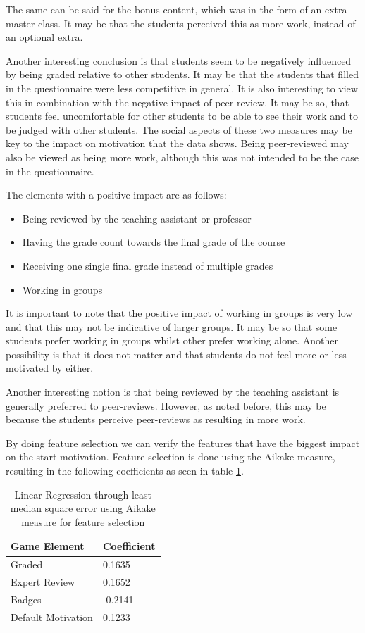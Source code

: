 \documentclass[11pt]{article}
\newcommand{\ra}[1]{\renewcommand{\arraystretch}{#1}}
\begin{document}
The same can be said for the bonus content, which was in the form of an extra master class. It may be that the students perceived this as more work, instead of an optional extra.

Another interesting conclusion is that students seem to be negatively influenced by being graded relative to other students. It may be that the students that filled in the questionnaire were less competitive in general. It is also interesting to view this in combination with the negative impact of peer-review. It may be so, that students feel uncomfortable for other students to be able to see their work and to be judged with other students. The social aspects of these two measures may be key to the impact on motivation that the data shows. Being peer-reviewed may also be viewed as being more work, although this was not intended to be the case in the questionnaire.

The elements with a positive impact are as follows:
\begin{itemize}
  \item Being reviewed by the teaching assistant or professor
  \item Having the grade count towards the final grade of the course
  \item Receiving one single final grade instead of multiple grades
  \item Working in groups
\end{itemize}


It is important to note that the positive impact of working in groups is very low and that this may not be indicative of larger groups. It may be so that some students prefer working in groups whilst other prefer working alone. Another possibility is that it does not matter and that students do not feel more or less motivated by either.

Another interesting notion is that being reviewed by the teaching assistant is generally preferred to peer-reviews. However, as noted before, this may be because the students perceive peer-reviews as resulting in more work.

By doing feature selection we can verify the features that have the biggest impact on the start motivation. Feature selection is done using the Aikake measure, resulting in the following coefficients as seen in table \ref{lmsreg_aikake}.

\begin{table}[h!t]\centering
\ra{1.3}
\footnotesize
\begin{tabular}{@{}ll@{}}
\toprule
Game Element & Coefficient \\
\midrule
Graded 			& 0.1635 \\
Expert Review 		& 0.1652 \\
Badges 			& -0.2141 \\
Default Motivation	& 0.1233\\
\bottomrule
\end{tabular}
\caption{Linear Regression through least median square error using Aikake measure for feature selection}
\label{lmsreg_aikake}
\end{table}
\end{document}
